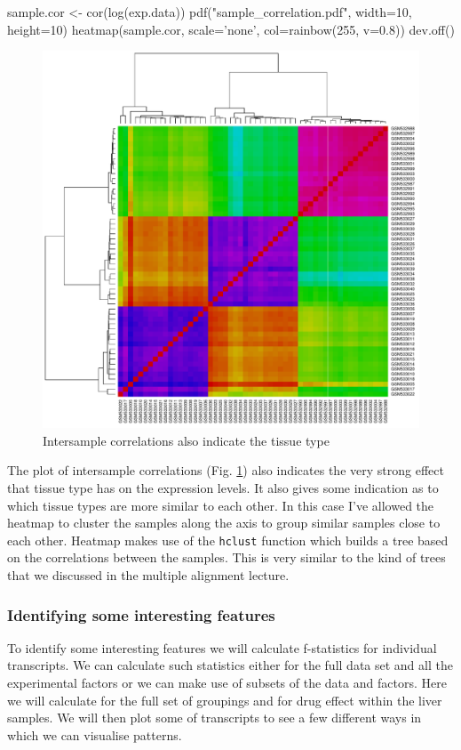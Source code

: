 \documentclass[11pt]{article}
\begin{document}
\begin{rcode}
  sample.cor <- cor(log(exp.data))
  pdf("sample_correlation.pdf", width=10, height=10)
  heatmap(sample.cor, scale='none', col=rainbow(255, v=0.8))
  dev.off()
\end{rcode}

\begin{figure}[ht]
  \includegraphics[width=\textwidth]{images/sample_correlation}
  \caption{Intersample correlations also indicate the tissue type}
  \label{corplot}
\end{figure}

The plot of intersample correlations (Fig. \ref{corplot}) also indicates
the very strong effect that tissue type has on the expression levels. It
also gives some indication as to which tissue types are more similar to each
other. In this case I've allowed the heatmap to cluster the samples along
the axis to group similar samples close to each other. Heatmap makes
use of the \texttt{hclust} function which builds a tree based on the 
correlations between the samples. This is very similar to the kind of trees
that we discussed in the multiple alignment lecture.

\newpage


\subsubsection{Identifying some interesting features}
\label{sec-1-3-3}
To identify some interesting features we will calculate f-statistics for
individual transcripts. We can calculate such statistics either for
the full data set and all the experimental factors or we can make
use of subsets of the data and factors. Here we will calculate for
the full set of groupings and for drug effect within the liver samples.
We will then plot some of transcripts to see a few different ways in
which we can visualise patterns.
\end{document}

